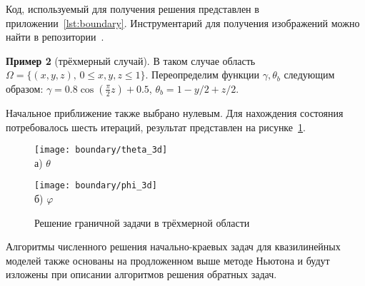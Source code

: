 Код, используемый для получения решения представлен в приложении~\ref{lst:boundary}.
Инструментарий для получения изображений можно найти в репозитории~\cite{mesenev-github}.

\textbf{Пример 2} (трёхмерный случай).
В таком случае область $\Omega=\{(x,y,z),\, 0 \leq x,y,z \leq 1 \}$.
Переопределим функции $\gamma, \theta_b$ следующим образом:
$\gamma = 0.8 \cos\left(\frac{\pi}{2} z\right) + 0.5$,
$\theta_b = 1- y / 2 + z /2$.

Начальное приближение также выбрано нулевым.
Для нахождения состояния потребовалось шесть итераций,
результат представлен на рисунке~\ref{fig:4_1:boundary_3d}.
\begin{figure}[h!t]
    \begin{minipage}[b][][b]{0.49\linewidth}
        \centering
        \texttt{[image: boundary/theta\_3d]} \\ а) $\theta$
    \end{minipage}
    \hfill
    \begin{minipage}[b][][b]{0.49\linewidth}
        \centering
        \texttt{[image: boundary/phi\_3d]} \\ б) $\varphi$
    \end{minipage}
    \caption{Решение граничной задачи в трёхмерной области}
    \label{fig:4_1:boundary_3d}
\end{figure}

\begin{remark}
    Алгоритмы численного решения начально-краевых задач для квазилинейных моделей
    также основаны на продложенном выше методе Ньютона и будут изложены при описании
    алгоритмов решения обратных задач.
\end{remark}

